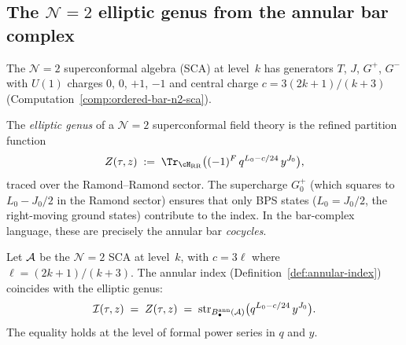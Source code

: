 \subsection{The $\mathcal{N}=2$ elliptic genus from the
annular bar complex}
\label{subsec:n2-elliptic-genus}

\providecommand{\Gp}{G^+}
\providecommand{\Gm}{G^-}
\providecommand{\wsl}{\widehat{\mathfrak{sl}}}

The $\mathcal N=2$ superconformal algebra (SCA) at
level~$k$ has generators $T$, $J$, $\Gp$, $\Gm$ with
$U(1)$ charges $0$, $0$, $+1$, $-1$ and central charge
$c = 3(2k+1)/(k+3)$
(Computation~\ref{comp:ordered-bar-n2-sca}).

The \emph{elliptic genus} of a $\mathcal N=2$
superconformal field theory is the refined partition
function
\begin{equation}\label{eq:elliptic-genus-def}
Z(\tau,z)
\;:=\;
\Tr_{\cH_{\mathrm{RR}}}
\bigl(
(-1)^F\,q^{L_0-c/24}\,y^{J_0}
\bigr),
\end{equation}
traced over the Ramond--Ramond sector. The supercharge
$G^+_0$ (which squares to $L_0 - J_0/2$ in the Ramond
sector) ensures that only BPS states
($L_0 = J_0/2$, the right-moving ground states)
contribute to the index. In the bar-complex language,
these are precisely the annular bar \emph{cocycles}.

\begin{theorem}%
\label{thm:elliptic-genus-annular}%
%
%
%
Let $\mathcal{A}$ be the $\mathcal N=2$ SCA at level~$k$,
with $c = 3\ell$ where $\ell = (2k+1)/(k+3)$.
The annular index
(Definition~\ref{def:annular-index})
coincides with the elliptic genus:
\begin{equation}\label{eq:elliptic-genus-annular}
\mathcal{I}(\tau,z)
\;=\;
Z(\tau,z)
\;=\;
\operatorname{str}_{B^{\mathrm{ann}}_\bullet(\mathcal{A})}
\bigl(
q^{L_0-c/24}\,y^{J_0}
\bigr).
\end{equation}
The equality holds at the level of formal power series
in $q$ and $y$.
\end{theorem}

